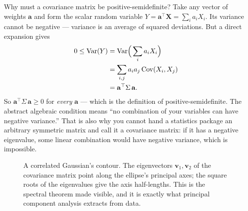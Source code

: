 \begin{whybox}
Why must a covariance matrix be positive-semidefinite? Take any vector of weights $\mathbf{a}$ and
form the scalar random variable $Y=\mathbf{a}^\top \mathbf{X}=\sum_i a_i X_i$. Its variance cannot be
negative --- variance is an average of squared deviations. But a direct expansion gives
\begin{align*}
  0 \le \operatorname{Var}(Y) &= \operatorname{Var}\!\Big(\sum_i a_i X_i\Big) \\
      &= \sum_{i,j} a_i a_j \operatorname{Cov}(X_i,X_j) \\
      &= \mathbf{a}^\top \Sigma\,\mathbf{a}.
\end{align*}
So $\mathbf{a}^\top \Sigma\,\mathbf{a}\ge 0$ for \emph{every} $\mathbf{a}$ --- which is the definition
of positive-semidefinite. The abstract algebraic condition means ``no combination of your
variables can have negative variance.'' That is also why you cannot hand a statistics package an
arbitrary symmetric matrix and call it a covariance matrix: if it has a negative eigenvalue, some
linear combination would have negative variance, which is impossible.
\end{whybox}

\begin{figure}[H]
\centering
{}
\caption{A correlated Gaussian's contour. The eigenvectors $\mathbf{v}_1,\mathbf{v}_2$ of the
covariance matrix point along the ellipse's principal axes; the square roots of the eigenvalues give
the axis half-lengths. This is the spectral theorem made visible, and it is exactly what principal
component analysis extracts from data.}
\label{chAcla:fig-ellipse}
\end{figure}

